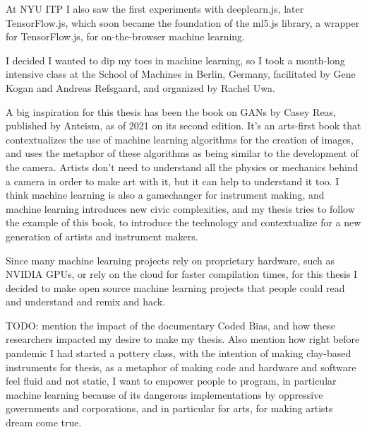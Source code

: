 At NYU ITP I also saw the first experiments with deeplearn.js, later TensorFlow.js, which soon became the foundation of the ml5.js library, a wrapper for TensorFlow.js, for on-the-browser machine learning.

I decided I wanted to dip my toes in machine learning, so I took a month-long intensive class at the School of Machines in Berlin, Germany, facilitated by Gene Kogan and Andreas Refsgaard, and organized by Rachel Uwa.

A big inspiration for this thesis has been the book on GANs by Casey Reas, published by Anteism, as of 2021 on its second edition. It’s an arts-first book that contextualizes the use of machine learning algorithms for the creation of images, and uses the metaphor of these algorithms as being similar to the development of the camera. Artists don’t need to understand all the physics or mechanics behind a camera in order to make art with it, but it can help to understand it too. I think machine learning is also a gamechanger for instrument making, and machine learning introduces new civic complexities, and my thesis tries to follow the example of this book, to introduce the technology and contextualize for a new generation of artists and instrument makers.

Since many machine learning projects rely on proprietary hardware, such as NVIDIA GPUs, or rely on the cloud for faster compilation times, for this thesis I decided to make open source machine learning projects that people could read and understand and remix and hack.

TODO: mention the impact of the documentary Coded Bias, and how these researchers impacted my desire to make my thesis. Also mention how right before pandemic I had started a pottery class, with the intention of making clay-based instruments for thesis, as a metaphor of making code and hardware and software feel fluid and not static, I want to empower people to program, in particular machine learning because of its dangerous implementations by oppressive governments and corporations, and in particular for arts, for making artists dream come true.
